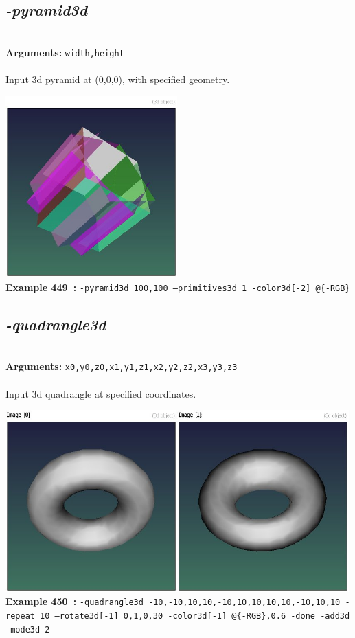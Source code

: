 \documentclass[a4paper,11pt,twoside]{book}
\begin{document}
\subsection{\emph{-pyramid3d} }\vspace*{-0.5em}
~\\\textbf{Arguments: } 
{\small \texttt{width,height}}\\~\\
Input 3d pyramid at (0,0,0), with specified geometry.
\begin{center}\includegraphics[keepaspectratio=true,height=7cm,width=\textwidth]{img/gmic_def449.jpg}\\
{\footnotesize \textbf{Example 449~:} \texttt{-pyramid3d 100,100 --primitives3d 1 -color3d[-2] @\{-RGB\}}}
\end{center}

\subsection{\emph{-quadrangle3d} }\vspace*{-0.5em}
~\\\textbf{Arguments: } 
{\small \texttt{x0,y0,z0,x1,y1,z1,x2,y2,z2,x3,y3,z3}}\\~\\
Input 3d quadrangle at specified coordinates.
\begin{center}\includegraphics[keepaspectratio=true,height=7cm,width=\textwidth]{img/gmic_def450.jpg}\\
{\footnotesize \textbf{Example 450~:} \texttt{-quadrangle3d -10,-10,10,10,-10,10,10,10,10,-10,10,10 -repeat 10 --rotate3d[-1] 0,1,0,30 -color3d[-1] @\{-RGB\},0.6 -done -add3d -mode3d 2}}
\end{center}
\end{document}
